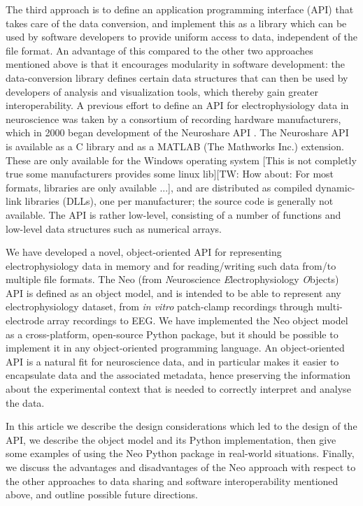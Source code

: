 \documentclass{frontiers}
\newcommand{\latin}[1]{\textit{#1}}
\newcommand{\samuel}[1]{[\textcolor{RubineRed}{#1}]}
\newcommand{\thomas}[1]{[\textcolor{Emerald}{TW: #1}]}
\begin{document}
The third approach is to define an application programming interface (API) that takes care of the data conversion, and implement this as a library which can be used by software developers to provide uniform access to data, independent of the file format.
An advantage of this compared to the other two approaches mentioned above is that it encourages modularity in software development: the data-conversion library defines certain data structures that can then be used by developers of analysis and visualization tools, which thereby gain greater interoperability.
A previous effort to define an API for electrophysiology data in neuroscience was taken by a consortium of recording hardware manufacturers, which in 2000 began development of the Neuroshare API \citep{neuroshare}.
The Neuroshare API is available as a C library and as a MATLAB (The Mathworks Inc.) extension.
These are only available for the Windows operating system \samuel{This is not completly true some manufacturers provides some linux lib}\thomas{How about: For most formats, libraries are only available ...}, and are distributed as compiled dynamic-link libraries (DLLs), one per manufacturer; the source code is generally not available.
The API is rather low-level, consisting of a number of functions and low-level data structures such as numerical arrays.

We have developed a novel, object-oriented API for representing electrophysiology data in memory and for reading/writing such data from/to multiple file formats.
The Neo (from \emph{N}euroscience \emph{E}lectrophysiology \emph{O}bjects) API is defined as an object model, and is intended to be able to represent any electrophysiology dataset, from \latin{in vitro} patch-clamp recordings through multi-electrode array recordings to EEG.
We have implemented the Neo object model as a cross-platform, open-source Python package, but it should be possible to implement it in any object-oriented programming language.
An object-oriented API is a natural fit for neuroscience data, and in particular makes it easier to encapsulate data and the associated metadata, hence preserving the information about the experimental context that is needed to correctly interpret and analyse the data.

In this article we describe the design considerations which led to the design of the API, we describe the object model and its Python implementation, then give some examples of using the Neo Python package in real-world situations. Finally, we discuss the advantages and disadvantages of the Neo approach with respect to the other approaches to data sharing and software interoperability mentioned above, and outline possible future directions.
\end{document}

